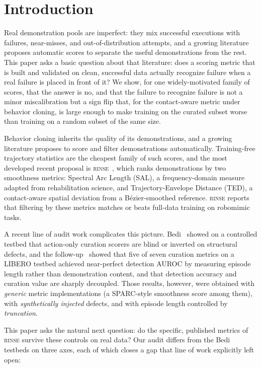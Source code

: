 \documentclass[10pt]{article}
\newcommand{\rinse}{\textsc{rinse}}
\begin{document}
\section{Introduction}

Real demonstration pools are imperfect: they mix successful executions with
failures, near-misses, and out-of-distribution attempts, and a growing
literature proposes automatic scores to separate the useful demonstrations
from the rest. This paper asks a basic question about that literature: does
a scoring metric that is built and validated on clean, successful data
actually recognize failure when a real failure is placed in front of it? We
show, for one widely-motivated family of scores, that the answer is no, and
that the failure to recognize failure is not a minor miscalibration but a
sign flip that, for the contact-aware metric under behavior cloning, is
large enough to make training on the curated subset worse than training on
a random subset of the same size.

Behavior cloning inherits the quality of its demonstrations, and a growing
literature proposes to score and filter demonstrations automatically.
Training-free trajectory statistics are the cheapest family of such scores,
and the most developed recent proposal is \rinse{}~\citep{rinse}, which ranks
demonstrations by two smoothness metrics: Spectral Arc Length (SAL), a
frequency-domain measure adapted from rehabilitation science, and
Trajectory-Envelope Distance (TED), a contact-aware spatial deviation from a
B\'ezier-smoothed reference. \rinse{} reports that filtering by these metrics
matches or beats full-data training on robomimic tasks.

A recent line of audit work complicates this picture.
Bedi~\citep{bedi-audit} showed on a controlled testbed that action-only
curation scorers are blind or inverted on structural defects, and the
follow-up~\citep{bedi-policy} showed that five of seven curation metrics on a
LIBERO testbed achieved near-perfect detection AUROC by measuring episode
length rather than demonstration content, and that detection accuracy and
curation value are sharply decoupled. Those results, however, were obtained
with \emph{generic} metric implementations (a SPARC-style smoothness score
among them), with \emph{synthetically injected} defects, and with episode
length controlled by \emph{truncation}.

This paper asks the natural next question: do the specific, published metrics
of \rinse{} survive these controls on real data? Our audit differs from the
Bedi testbeds on three axes, each of which closes a gap that line of work
explicitly left open:
\end{document}
